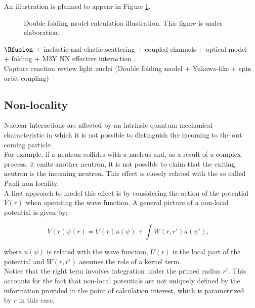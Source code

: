 \documentclass[openany]{book}
\begin{document}
An illustration is planned to appear in Figure \ref{fig:DoubleFolding}.

\begin{figure}[H]
	
	\caption[Double folding model calculation illustration]{Double folding model calculation illustration. This figure is under elaboration.}
	\label{fig:DoubleFolding}
\end{figure}

$\Ofusion$ + inelastic and elastic scattering + coupled channels + optical model + folding + M3Y NN effective interaction \cite{hassanain_al_sebiey_2014}.  \\

Capture reaction review light nuclei (Double folding model + Yukawa-like + spin orbit coupling)\cite{ghasemi_sadeghi_2018}

\subsection{Non-locality}  \label{sub:potential_nonlocality}

Nuclear interactions are affected by an intrinsic quantum mechanical characteristic in which it is not possible to distinguish the incoming to the out coming particle. \\

For example, if a neutron collides with a nucleus and, as a result of a complex process, it emits another neutron, it is not possible to claim that the exiting neutron is the incoming neutron.  This effect is closely related with the so called Pauli non-locality. \\

A first approach to model this effect is by considering the action of the potential $V(r)$ when operating the wave function. A general picture of a non-local potential is given by:

\begin{equation} \label{eq:nonLocality_picture}
	V(r) \psi(r) = U(r) u(\psi) + \int W(r, r') u(\psi'),
\end{equation}

where $u(\psi)$ is related with the wave function, $U(r)$ is the local part of the potential and $W(r, r')$ assumes the role of a kernel term. \\

Notice that the right term involves integration under the primed radius $r'$. This accounts for the fact that non-local potentials are not uniquely defined by the information provided in the point of calculation interest, which is parametrized by $r$ in this case. \\
\end{document}

